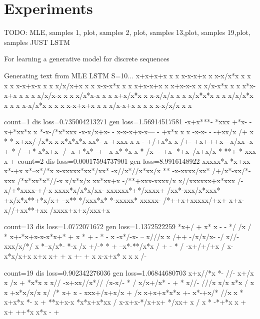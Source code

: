 \section{Experiments}



TODO:
MLE, samples
1, plot, samples
2, plot, samples
13,plot, samples
19,plot, samples
JUST LSTM


For learning a generative model for discrete sequences


Generating text from MLE LSTM S=10...
x+x+x+x x   x  
x-x-x+x x      
x-x/x*x x x x x
x-x+x-x x x    
x/x/x+x x   x  
x-x-x*x x   x  
x+x-x+x x      
x+x-x-x   x    
x/x-x*x x x    
x*x-x+x x x   x
x/x/x-x x     x
x/x*x-x x x    
x+x/x*x x      
x-x/x/x x x    
x/x*x*x x x    
x/x/x*x x x   x
x-x/x*x   x x x
x-x+x+x x x    
x/x-x+x x x x  
x-x/x/x   x x  




count=1
dis loss=0.735004213271
gen loss=1.56914517581
-x+x***- *xxx  
+*x- -x+*xx*x x
*-x-/*x*xxx    
-x-x/x+x-   -  
  x-x-x+x-x--- 
- +x*x x     x 
-x-x- - -+xx/x 
/+ x  *  *     
x+xx/-/x*x-x   
 x*x*x*x-xx*-  
x--+xxx-x x   -
 +/+x*x x  /+- 
 +x+++x---x/xx 
-x    + *  /   
 --+*-x*x+x- / 
-x-+*x* -+     
--x-x*-*x-x    
* /x- - +x-    
*+x--/x+x/x *  
**+-* xxx x-+  
count=2
dis loss=0.00017594737901
gen loss=8.9916148922
  xxxxx*x-*x+xx
x*-+x x*--x*/*x
x-xxxxx*xx*/xx*
 -x//x*//x*xx/x
 ** -x-xxxx/xx*
/+/x*-xx/*- xxx
  /*x*xx*x*//-x
x/x*x/x xx*xx+x
-/**+xxx-xxxx/x
x//xxxxxx+x*xxx
/-x/+*xxxx-+/-x
 xxxx*x/x*x/xx-
xxxxxx*+*/xxxx+
/xx*-xxx/x*xxx*
 +x/x*x**+*x/x+
 --x** */xxx*x*
*-xxxxx* xxxxx-
/*++x+xxxxx/+x+
x+x-x//+xx**+xx
/xxxx+x+x/xxx+x



count=13
dis loss=1.0772071672
gen loss=1.1372522259
*x+/  +    x*  
x      - -  */ 
 /x     / *    
x+-*x+x-x-x*x+*
+ x *   +      
-          * - 
x  -x*/-x-  -- 
  x///x x  /++ 
-/x/x/x-    -/ 
x//-xxx/x/*/  x
*--x/x*- *-x   
/x  +/-* *     
+ --x*-**/x*x /
+   -   *      
/ -x+/+/+x  /  
 x-x*x/x+x     
x+x   x+   + x 
 +-  +        x
  x-x+x*       
x x        x /-


count=19
dis loss=0.902342276036
gen loss=1.06844680703
x+x//*x   *-   
//- x+/x x /x  
+ *x*x  x x//  
-x+xx//x*//    
/x-x/-  * /    
x/x+/x* - +   *
x//- ///x      
x/x x*x / x  x 
+x*x/x/x     x/
/* x+  x      -
xxx+/x+x/x    +
/x x+x+x*x*x +-
x*-+x/* //x x *
x+x*x *-  x +  
 **x+x-x       
*x*x+x*xx /    
x-x+x-*/x+x+   
*/xx+ x /  x * 
-*+*x x + x+   
++*x x*x   - + 